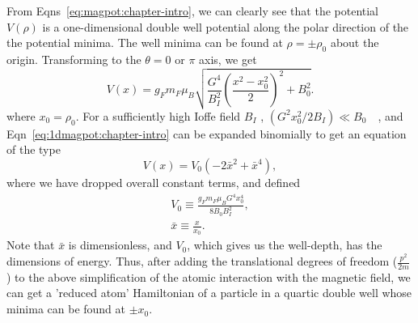 From Eqns~\ref{eq:magpot:chapter-intro}, we can clearly see that the potential $V(\rho)$ is a one-dimensional double well potential along the polar direction of the 
the potential minima. The well minima can be found at $\rho=\pm \rho_0$ about the origin. Transforming to the $\theta= 0$ or $\pi$ axis, we get 
\begin{equation}
V(x) = g_F m_F \mu_B \sqrt{\frac{G^4}{B^2_I}\left(\frac{x^2-x^2_0}{2} \right)^2+B^2_0}.
\label{eq:1dmagpot:chapter-intro}
\end{equation}
where $x_0=\rho_0$. For a sufficiently high Ioffe field $B_I$ , $\left(G^2x^2_0/2B_I\right) \ll B_0$~\cite{pethick:bec}~\cite{doublewell:chip}, and Eqn~\ref{eq:1dmagpot:chapter-intro} can be expanded binomially to get an equation of the type
\begin{equation}
 V(x)= V_0 (-2{\bar x}^2 + {\bar x}^4),
\end{equation}
where we have dropped overall constant terms, and defined
\begin{eqnarray}
 V_0 \equiv \frac{g_F m_F \mu_B G^4 x^4_0}{8B_0B^2_I}, \nonumber \\
 {\bar x}\equiv \frac{x}{x_0}. 
 \label{eq:welldepth:chapter-intro}
 \end{eqnarray}
Note that ${\bar x}$ is dimensionless, and $V_0$, which gives us the well-depth, has the dimensions of energy. Thus, after adding the translational degrees of freedom ($\frac{p^2}{2m}$) to the above simplification of the atomic interaction with the magnetic field, we can get a 'reduced atom' Hamiltonian of a particle in a quartic double well whose minima can be found at $\pm x_0$. 

